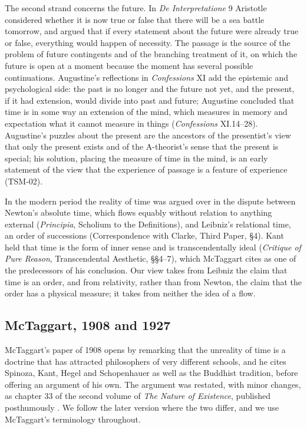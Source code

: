 \documentclass{situationist-preprint}
\begin{document}
The second strand concerns the future. In \emph{De Interpretatione} 9 Aristotle considered whether it is now true or false that there will be a sea battle tomorrow, and argued that if every statement about the future were already true or false, everything would happen of necessity. The passage is the source of the problem of future contingents and of the branching treatment of it, on which the future is open at a moment because the moment has several possible continuations. Augustine's reflections in \emph{Confessions} XI add the epistemic and psychological side: the past is no longer and the future not yet, and the present, if it had extension, would divide into past and future; Augustine concluded that time is in some way an extension of the mind, which measures in memory and expectation what it cannot measure in things (\emph{Confessions} XI.14--28). Augustine's puzzles about the present are the ancestors of the presentist's view that only the present exists and of the A-theorist's sense that the present is special; his solution, placing the measure of time in the mind, is an early statement of the view that the experience of passage is a feature of experience (TSM-02).

In the modern period the reality of time was argued over in the dispute between Newton's absolute time, which flows equably without relation to anything external (\emph{Principia}, Scholium to the Definitions), and Leibniz's relational time, an order of successions (Correspondence with Clarke, Third Paper, §4). Kant held that time is the form of inner sense and is transcendentally ideal (\emph{Critique of Pure Reason}, Transcendental Aesthetic, §§4--7), which McTaggart cites as one of the predecessors of his conclusion. Our view takes from Leibniz the claim that time is an order, and from relativity, rather than from Newton, the claim that the order has a physical measure; it takes from neither the idea of a flow.

\subsection{McTaggart, 1908 and 1927}

McTaggart's paper of 1908 opens by remarking that the unreality of time is a doctrine that has attracted philosophers of very different schools, and he cites Spinoza, Kant, Hegel and Schopenhauer as well as the Buddhist tradition, before offering an argument of his own. The argument was restated, with minor changes, as chapter 33 of the second volume of \emph{The Nature of Existence}, published posthumously \citep{McTaggart1927}. We follow the later version where the two differ, and we use McTaggart's terminology throughout.
\end{document}
